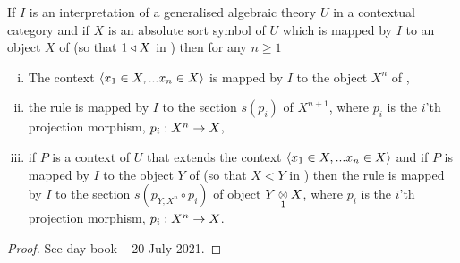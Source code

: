 \begin{lemma}
If $I$ is an interpretation of a generalised algebraic theory $U$ in a contextual category \catcw and if $X$ is an absolute sort symbol of $U$ which is mapped 
by $I$ to an object $X$ of \catcw (so that $1 \base X$ in \catc) then for any $n \geq 1$ 
\begin{enumerate}[(i)]
\item
The context $\tuple{\ofT{x_1}{X},...\ofT{x_n}{X}}$ is mapped by $I$ to the object $X^n$ of \catc,
\item the rule 
 is mapped by $I$ to the section $s(p_i)$ of $X^{n+1}$, where $p_i$ is the $i$'th projection morphism, $p_i: X^n \morph X$,
\item if $P$ is a context of $U$ that extends the context $\tuple{\ofT{x_1}{X},...\ofT{x_n}{X}}$ and if $P$ is mapped by $I$ to
the object $Y$ of \catcw (so that $X < Y$ in \catc) then the rule 
 is mapped by $I$ to the section $s(p_{Y,X^n}\circ p_i)$ of object $\crossx{Y}{X}{1}$, where $p_i$ is the $i$'th projection morphism, $p_i: X^n \morph X$.
\end{enumerate}
\end{lemma}
\begin{proof}
See day book -- 20 July 2021.
\end{proof}